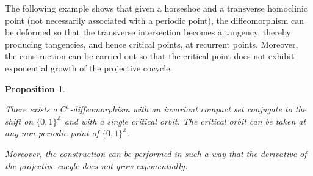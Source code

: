 \documentclass[a4paper,11pt]{article}
\newtheorem{proposition}[lemma]{Proposition}
\theoremstyle{definition}
\def\ZZ{{\mathbb Z}}
\begin{document}
The following example shows that given a horseshoe and a transverse homoclinic point (not necessarily associated with a periodic point), the diffeomorphism can be deformed so that the transverse intersection becomes a tangency, thereby producing tangencies, and hence critical points, at recurrent points. Moreover, the construction can be carried out so that the critical point does not exhibit exponential growth of the projective cocycle.

\begin{proposition} \label{recurrent critical}

There exists a $C^1$-diffeomorphism  with an invariant compact set
conjugate to the shift on $\{0,1\}^\ZZ$ and with a single critical orbit.
The critical orbit can be taken  at any non-periodic point of $\{0,1\}^\ZZ$.

Moreover, the construction can be performed in such a way that the derivative of the projective cocyle does not grow exponentially. 
\end{proposition}
\end{document}
